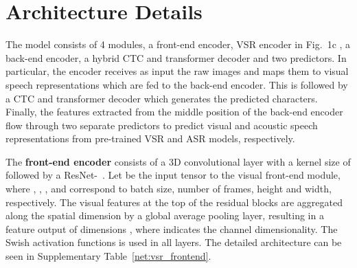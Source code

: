 \documentclass[twocolumn]{article}
\begin{document}
\section{Architecture Details}
\label{sec:SI_arch}
The model consists of 4 modules, a front-end encoder, VSR encoder in Fig.~1c
, a back-end encoder, a hybrid CTC and transformer decoder and two predictors. In particular, the encoder receives as input the raw images and maps them to visual speech representations which are fed to the back-end encoder. This is followed by a CTC and transformer decoder which generates the predicted characters. Finally, the features extracted from the middle position of the back-end encoder flow through two separate predictors to predict visual and acoustic speech representations from pre-trained VSR and ASR models, respectively.

The \textbf{front-end encoder} consists of a 3D convolutional layer with a kernel size of  followed by a  ResNet-~\cite{he2016deep, stafylakis2017combining}.  Let  be the input tensor to the visual front-end module, where , , , and  correspond to batch size, number of frames, height and width, respectively. The visual features at the top of the residual blocks are aggregated along the spatial dimension by a global average pooling layer, resulting in a feature output of dimensions , where  indicates the channel dimensionality. The Swish activation functions is used in all layers. The detailed architecture can be seen in Supplementary Table~\ref{net:vsr_frontend}.
\end{document}
